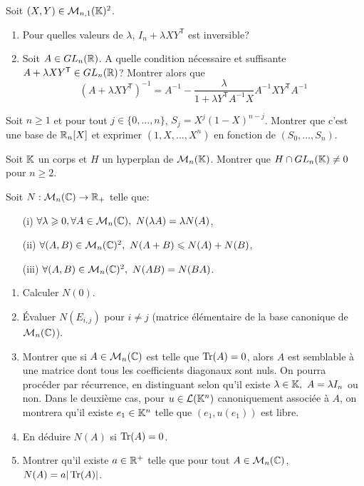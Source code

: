 \documentclass[12pt]{article}
\begin{document}
\begin{exercise}
	Soit $(X,Y)\in\mathcal{M}_{n,1}(\mathbb{K})^{2}$.
	\begin{enumerate}
		\item
		Pour quelles valeurs de $\lambda$, $I_{n}+\lambda XY^\mathsf{T}$ est
		inversible?
		\item
		Soit $A\in GL_{n}(\mathbb{R})$. A quelle condition nécessaire et suffisante
		$A+\lambda XY^\mathsf{T}\in GL_{n}(\mathbb{R})$? Montrer alors que 
		$$(A+\lambda XY^\mathsf{T})^{-1}=A^{-1}-\frac{\lambda}{1+\lambda
		Y^{\mathsf{T}}A^{-1}X}A^{-1}XY^{\mathsf{T}}A^{-1}$$
	\end{enumerate}
\end{exercise}

\begin{exercise}
	Soit $n\geqslant1$ et pour tout $j\in\{0,\dots,n\}$, $S_{j}=X^{j}(1-X)^{n-j}$.
	Montrer que c'est une base de $\mathbb{R}_{n}[X]$ et exprimer $(1,X,\dots,X^{n})$ en
	fonction de $(S_{0},\dots,S_{n})$.
\end{exercise}

\begin{exercise}
	Soit $\mathbb{K}$ un corps et $H$ un hyperplan de $\mathcal{M}_{n}(\mathbb{K})$. Montrer que $H\cap
	GL_{n}(\mathbb{K})\neq 0$ pour $n\geqslant2$.
\end{exercise}

\begin{exercise}
	Soit $N:\mathcal{M}_{n}(\mathbb{C})\to\mathbb{R}_{+}$ telle que:
	\begin{enumerate}
		\item
		[(i)] $\forall \lambda\geqslant0,\forall A\in\mathcal{M}_{n}(\mathbb{C}),~N(\lambda
		A)=\lambda N(A)$,
		\item
		[(ii)] $\forall (A,B)\in\mathcal{M}_{n}(\mathbb{C})^{2},~N(A+B)\leqslant N(A)+N(B)$,
		\item
		[(iii)] $\forall (A,B)\in\mathcal{M}_{n}(\mathbb{C})^{2},~N(AB)=N(BA)$.
	\end{enumerate}
	\begin{enumerate}
		\item
		Calculer $N(0)$.
		\item
		Évaluer $N(E_{i,j})$ pour $i\neq j$ (matrice élémentaire de la base
		canonique de $\mathcal{M}_{n}(\mathbb{C})$).
		\item
		Montrer que si $A\in\mathcal{M}_{n}(\mathbb{C})$ est telle que $\operatorname{Tr}(A)=0$, alors $A$ est
		semblable à une matrice dont tous les coefficients diagonaux sont nuls. On
		pourra procéder par récurrence, en distinguant selon qu'il existe
		$\lambda\in\mathbb{K},~A=\lambda I_{n}$ ou non. Dans le deuxième cas, pour
		$u\in\mathcal{L}(\mathbb{K}^{n})$ canoniquement associée à $A$, on montrera qu'il existe
		$e_{1}\in\mathbb{K}^{n}$ telle que $(e_{1},u(e_{1}))$ est libre.
		\item
		En déduire $N(A)$ si $\operatorname{Tr}(A)=0$.
		\item
		Montrer qu'il existe $a\in\mathbb{R}^{+}$ telle que pour tout $A\in\mathcal{M}_{n}(\mathbb{C})$,
		$N(A)=a\vert\operatorname{Tr}(A)\vert$.
	\end{enumerate}
\end{exercise}
\end{document}

